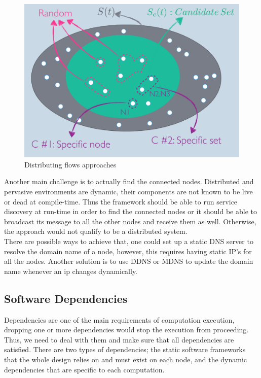  \begin{figure}[H]
 	\centering
 	\includegraphics[scale=0.45]{images/set.png} 
 	\caption{Distributing flows approaches}
 	\label{fig:distributing-flows}
 \end{figure}

\noindent Another main challenge is to actually find the connected nodes. Distributed and pervasive environments are dynamic, their components are not known to be live or dead at compile-time. Thus the framework should be able to run service discovery at run-time in order to find the connected nodes or it should be able to broadcast its message to all the other nodes and receive them as well. Otherwise, the approach would not qualify to be a distributed system. \\

\noindent There are possible ways to achieve that, one could set up a static DNS server to resolve the domain name of a node, however, this requires having static IP's for all the nodes. Another solution is to use DDNS or MDNS to update the domain name whenever an ip changes dynamically.









\subsection{Software Dependencies}

Dependencies are one of the main requirements of computation execution, dropping one or more dependencies would stop the execution from proceeding. Thus, we need to deal with them and make sure that all dependencies are satisfied.  There are two types of dependencies; the static software frameworks that the whole design relies on and must exist on each node, and the dynamic dependencies that are specific to each computation. 

